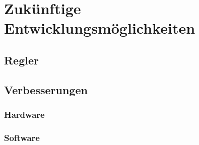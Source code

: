 \chapter{Zukünftige Entwicklungsmöglichkeiten}
\section{Regler}

\section{Verbesserungen}
\subsection{Hardware}

\subsection{Software}

